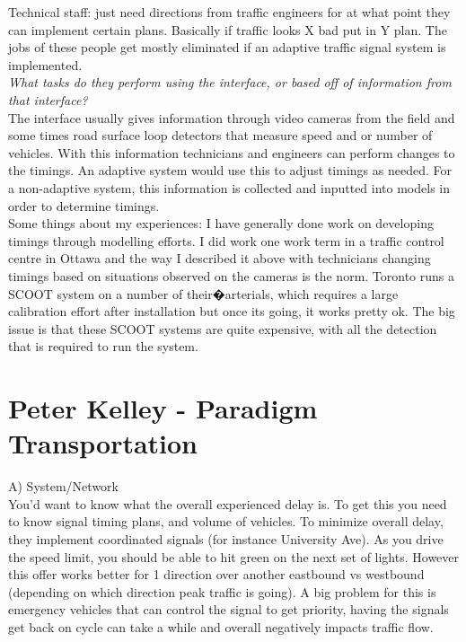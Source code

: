 \documentclass{report}
\begin{document}
\begin{appendices}
Technical staff: just need directions from traffic engineers for at what point they can implement certain plans.
Basically if traffic looks X bad put in Y plan.
The jobs of these people get mostly eliminated if an adaptive traffic signal system is implemented. \\ 

\noindent \emph{What tasks do they perform using the interface, or based off of information from that interface?} \\
The interface usually gives information through video cameras from the field and some times road surface loop detectors that measure speed and or number of vehicles.
With this information technicians and engineers can perform changes to the timings.
An adaptive system would use this to adjust timings as needed.
For a non-adaptive system, this information is collected and inputted into models in order to determine timings. \\

Some things about my experiences:
I have generally done work on developing timings through modelling efforts. I did work one work term in a traffic control centre in Ottawa and the way I described it above with technicians changing timings based on situations observed on the cameras is the norm.
Toronto runs a SCOOT system on a number of their�arterials, which requires a large calibration effort after installation but once its going, it works pretty ok.
The big issue is that these SCOOT systems are quite expensive, with all the detection that is required to run the system.

\section{Peter Kelley - Paradigm Transportation}
A) System/Network \\
You'd want to know what the overall experienced delay is.
To get this you need to know signal timing plans, and volume of vehicles.
To minimize overall delay, they implement coordinated signals (for instance University Ave).
As you drive the speed limit, you should be able to hit green on the next set of lights.
However this offer works better for 1 direction over another eastbound vs westbound (depending on which direction peak traffic is going).
A big problem for this is emergency vehicles that can control the signal to get priority, having the signals get back on cycle can take a while and overall negatively impacts traffic flow.


\end{appendices}
\end{document}
